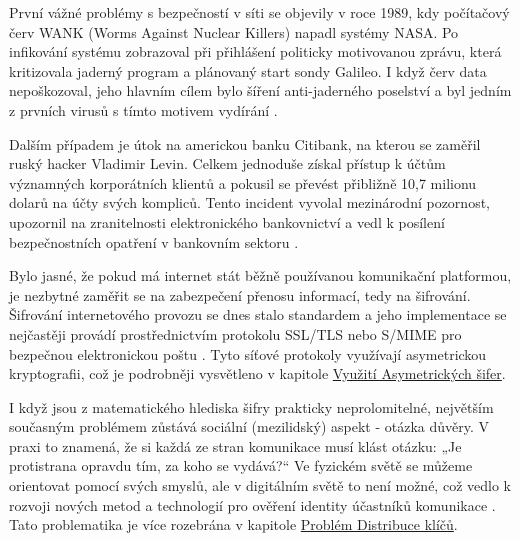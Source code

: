 První vážné problémy s bezpečností v síti se objevily v roce 1989, kdy počítačový červ WANK (Worms Against Nuclear Killers) napadl systémy NASA. Po infikování systému zobrazoval při přihlášení politicky motivovanou zprávu, která kritizovala jaderný program a plánovaný start sondy Galileo. I když červ data nepoškozoval, jeho hlavním cílem bylo šíření anti-jaderného poselství a byl jedním z prvních virusů s tímto motivem vydírání \parencite{erben2014}.

Dalším případem je útok na americkou banku Citibank, na kterou se zaměřil ruský hacker Vladimir Levin. Celkem jednoduše získal přístup k účtům významných korporátních klientů a pokusil se převést přibližně 10,7 milionu dolarů na účty svých kompliců. Tento incident vyvolal mezinárodní pozornost, upozornil na zranitelnosti elektronického bankovnictví a vedl k posílení bezpečnostních opatření v bankovním sektoru \parencite{erben2014}.

Bylo jasné, že pokud má internet stát běžně používanou komunikační platformou, je nezbytné zaměřit se na zabezpečení přenosu informací, tedy na šifrování. Šifrování internetového provozu se dnes stalo standardem a jeho implementace se nejčastěji provádí prostřednictvím protokolu SSL/TLS nebo S/MIME pro bezpečnou elektronickou poštu \parencite{pavlicek2012}. Tyto síťové protokoly využívají asymetrickou kryptografii, což je podrobněji vysvětleno v kapitole \hyperref[sec:asymetricka-kryptografie]{Využití Asymetrických šifer}.

I když jsou z matematického hlediska šifry prakticky neprolomitelné, největším současným problémem zůstává sociální (mezilidský) aspekt - otázka důvěry. V praxi to znamená, že si každá ze stran komunikace musí klást otázku: „Je protistrana opravdu tím, za koho se vydává?“ Ve fyzickém světě se můžeme orientovat pomocí svých smyslů, ale v digitálním světě to není možné, což vedlo k rozvoji nových metod a technologií pro ověření identity účastníků komunikace \parencite{burda2019}. Tato problematika je více rozebrána v kapitole \hyperref[sec:distribuce-klicu]{Problém Distribuce klíčů}.

\newpage